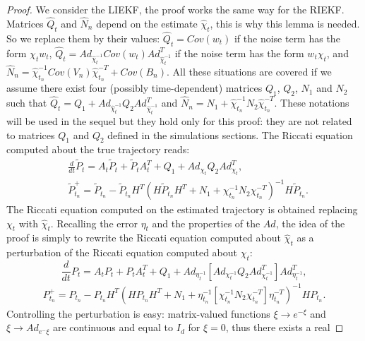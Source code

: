 \documentclass[a4paper,12pt,onecolumn]{article}
\begin{document}
\begin{proof}
We consider the LIEKF, the proof works the same way for the RIEKF. Matrices $\hat Q_t$ and $\hat N_n$ depend on the estimate $\hat \chi_t$, this is why this lemma is needed. So we replace them by their values: $\hat Q_t = Cov \left( w_t \right)$ if the noise term has the form $\chi_t w_t$, $\hat Q_t = Ad_{\hat \chi_t^{-1}} Cov \left( w_t \right) Ad_{\hat \chi_t^{-1}}^T$ if the noise term has the form $w_t \chi_t$, and $\hat N_n = \hat \chi_{t_n}^{-1} Cov \left( V_n \right)  \hat \chi_{t_n}^{-T} + Cov \left( B_n \right)$. All these situations are covered if we assume there exist four (possibly time-dependent) matrices $Q_1$, $Q_2$, $N_1$ and $N_2$ such that $\hat Q_t =  Q_1 + Ad_{\hat \chi_t^{-1}} Q_2 Ad_{\hat \chi_t^{-1}}^T$ and $\hat N_n =  N_1+ \hat \chi_{t_n}^{-1} N_2 \hat \chi_{t_n}^{-T} $. These notations will be used in the sequel but they hold only for this proof: they are not related to matrices $Q_1$ and $Q_2$ defined in the simulations sections. The Riccati equation computed about the true trajectory reads:
\begin{align*}
&\frac{d}{dt} \tilde{P}_t  = A_t \tilde{P}_t + \tilde{P}_t A_t^T + Q_1 + Ad_{\chi_t} Q_2 Ad_{\chi_t}^T, \\
&\tilde{P}_{t_n}^+  =\tilde{P}_{t_n}-\tilde{P}_{t_n} H^T \left( H \tilde{P}_{t_n} H^T + N_1+\chi_{t_n}^{-1} N_2 \chi_{t_n}^{-T} \right)^{-1} H \tilde{P}_{t_n}.
\end{align*}
The Riccati equation computed on the estimated trajectory is obtained replacing $\chi_t$ with $\hat{\chi}_t$.
Recalling the error $\eta_t$ and the properties of the $Ad$, the idea of the proof is simply to rewrite the Riccati equation computed about $\hat{\chi}_t$ as a perturbation of the Riccati equation computed about $\chi_t$:
\[
\frac{d}{dt} P_t  = A_t P_t + P_t A_t^T + Q_1 + Ad_{\eta_t^{-1}} \left[ Ad_{\chi_t^{-1}} Q_2 Ad_{\chi_t^{-1}}^T \right] Ad_{\eta_t^{-1}}^T,
\]
\begin{align*}
  P^+_{t_n} =
   P_{t_n}-P_{t_n} H^T \left( H P_{t_n} H^T + N_1+\eta_{t_n}^{-1} \left[ \chi_{t_n}^{-1} N_2 \chi_{t_n}^{-T} \right] \eta_{t_n}^{-T} \right)^{-1} H P_{t_n}.
\end{align*}
Controlling the perturbation is easy: matrix-valued functions $\xi \rightarrow e^{-\xi}$ and $\xi \rightarrow Ad_{e^-\xi}$ are continuous and equal to $I_d$ for $\xi=0$, thus there exists a real

\end{proof}
\end{document}
